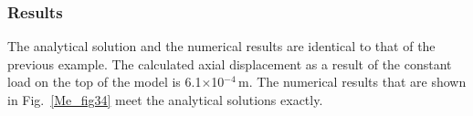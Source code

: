 \subsubsection{Results}
\label{subsubsec:Me5_res}

The analytical solution and the numerical results are identical to that of the previous example. The calculated axial displacement as a result of the constant load on the top of the model is 6.1$\times$10$^{-4}$\,m. The numerical results that are shown in Fig.~\ref{Me_fig34} meet the analytical solutions exactly.
